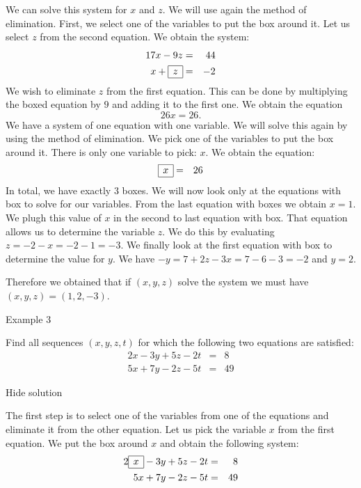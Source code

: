 We can solve this system for \( x \) and \( z \). We will use again the method of elimination. First, we select one of the variables to put the box around it. Let us select \( z \) from the second equation. We obtain the system: \begin{eqnarray*} 17x -9z&=&44\\ x+\begin{array}{|c|}\hline z \\ \hline\end{array}&=&-2 \end{eqnarray*} We wish to eliminate \( z \) from the first equation. This can be done by multiplying the boxed equation by \( 9 \) and adding it to the first one. We obtain the equation \[ 26x=26.\] We have a system of one equation with one variable. We will solve this again by using the method of elimination. We pick one of the variables to put the box around it. There is only one variable to pick: \( x \). We obtain the equation: \begin{eqnarray*} \begin{array}{|c|}\hline x\\ \hline\end{array}&=&26 \end{eqnarray*} In total, we have exactly \( 3 \) boxes. We will now look only at the equations with box to solve for our variables. From the last equation with boxes we obtain \( x=1 \). We plugh this value of \( x \) in the second to last equation with box. That equation allows us to determine the variable \( z \). We do this by evaluating \( z=-2-x=-2-1=-3 \). We finally look at the first equation with box to determine the value for \( y \). We have \( -y=7+2z-3x=7-6-3=-2 \) and \( y=2 \).

Therefore we obtained that if \( (x,y,z) \) solve the system we must have \( (x,y,z)=(1,2,-3) \).

Example 3


Find all sequences \( (x,y,z,t) \) for which the following two equations are satisfied: \begin{eqnarray*} 2x-3y+5z-2t&=&8\\ 5x+7y-2z-5t&=&49 \end{eqnarray*}

Hide solution

The first step is to select one of the variables from one of the equations and eliminate it from the other equation. Let us pick the variable \( x \) from the first equation. We put the box around \( x \) and obtain the following system:
\begin{eqnarray*} 2\begin{array}{|c|}\hline x\\ \hline\end{array}-3y+5z-2t&=&8\\ 5x+7y-2z-5t&=&49 \end{eqnarray*}

